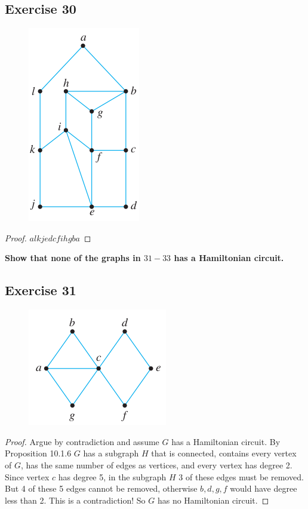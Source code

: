 \documentclass[14pt]{extarticle}
\newcommand{\cy}{\color{cyan}}
\begin{document}
\subsection{Exercise 30}
\begin{figure}[ht!]
\centering
\includegraphics[scale=0.5]{../images/10.1.30.png}
\end{figure}

\begin{proof}
\(alkjedcfihgba\)
\end{proof}

{\bf \cy Show that none of the graphs in $31-33$ has a Hamiltonian circuit.}

\subsection{Exercise 31}
\begin{figure}[ht!]
\centering
\includegraphics[scale=0.5]{../images/10.1.31.png}
\end{figure}

\begin{proof}
Argue by contradiction and assume \(G\) has a Hamiltonian circuit. By Proposition 10.1.6 \(G\) has a subgraph \(H\) that
is connected, contains every vertex of \(G\), has the same number of edges as vertices, and every vertex has degree 2.
Since vertex \(c\) has degree 5, in the subgraph \(H\) 3 of these edges must be removed. But 4 of these 5 edges cannot be
removed, otherwise \(b,d,g,f\) would have degree less than 2. This is a contradiction! So \(G\) has no Hamiltonian circuit.
\end{proof}
\end{document}
